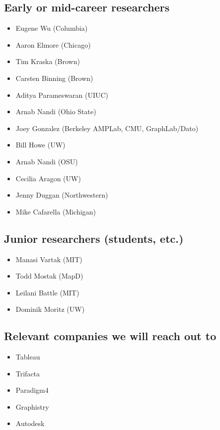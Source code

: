 \documentclass[journal]{vgtc}                %
\begin{document}
\subsection*{Early or mid-career researchers}
\begin{itemize}[topsep=0pt, partopsep=0pt, itemsep=-3pt]
\item Eugene Wu (Columbia)
\item Aaron Elmore (Chicago)
\item Tim Kraska (Brown)
\item Carsten Binning (Brown)
\item Aditya Parameswaran (UIUC)
\item Arnab Nandi (Ohio State)
\item Joey Gonzalez (Berkeley AMPLab, CMU, GraphLab/Dato)
\item Bill Howe (UW)
\item Arnab Nandi (OSU)
\item Cecilia Aragon (UW)
\item Jenny Duggan (Northwestern)
\item Mike Cafarella (Michigan)
\end{itemize}

\subsection*{Junior researchers (students, etc.)}
\begin{itemize}[topsep=0pt, partopsep=0pt, itemsep=-3pt]
\item Manasi Vartak (MIT)
\item Todd Mostak (MapD)
\item Leilani Battle (MIT)
\item Dominik Moritz (UW)
\end{itemize}

\subsection*{Relevant companies we will reach out to}
\begin{itemize}[topsep=0pt, partopsep=0pt, itemsep=-3pt]
\item Tableau
\item Trifacta
\item Paradigm4
\item Graphistry
\item Autodesk
\end{itemize}
\end{document}
